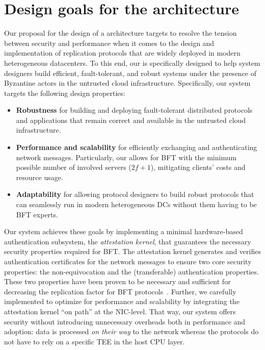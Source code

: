 \section{Design goals for the \projecttitle{} architecture}
\label{sec:requirements}
Our proposal for the design of a \projecttitle{} architecture targets to resolve the tension between security and performance when it comes to the design and implementation of replication protocols that are widely deployed in modern heterogeneous datacenters. To this end, our \projecttitle{} is specifically designed to help system designers build efficient, fault-tolerant, and robust systems under the presence of Byzantine actors in the untrusted cloud infrastructure. Specifically, our system targets the following design properties: 
\begin{itemize}
    \item {\bf{Robustness}} for building and deploying fault-tolerant distributed protocols and applications that remain correct and available in the untrusted cloud infrastructure.
    \item {\bf{Performance and scalability}} for efficiently exchanging and authenticating network messages. Particularly, our \projecttitle{} allows for BFT with the minimum possible number of involved servers ($2f+1$), mitigating clients' costs and resource usage.
    \item {\bf{Adaptability}} for allowing protocol designers to build robust protocols that can seamlessly run in modern heterogeneous DCs without them having to be BFT experts. 
\end{itemize}

\vspace{1pt}
Our system achieves these goals by implementing a minimal hardware-based authentication subsystem, the \emph{attestation kernel}, that guarantees the necessary security properties required for BFT. The attestation kernel generates and verifies authentication certificates for the network messages to ensure two core security properties: the non-equivocation and the (transferable) authentication properties. These two properties have been proven to be necessary and sufficient for decreasing the replication factor for BFT protocols~\cite{clement2012}. Further, we carefully implemented \projecttitle{} to optimize for performance and scalability by integrating the attestation kernel ``on path'' at the NIC-level. That way, our system offers security without introducing unnecessary overheads both in performance and adoption: data is processed \emph{on their way} to the network whereas the protocols do not have to rely on a specific TEE in the host CPU layer. 

